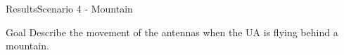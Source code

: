
\begin{frame}{Results}{Scenario 4 - Mountain}

  \begin{block}{Goal}
	Describe the movement of the antennas when the UA is flying behind a mountain.
  \end{block}

  \begin{figure}[H]
    \centerline{
    \hfill
    }
  \end{figure}

\end{frame}


